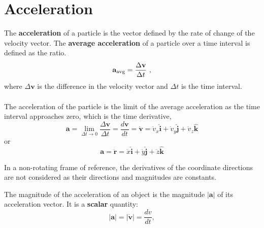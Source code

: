 \section{Acceleration}
The \textbf{acceleration} of a particle is the vector defined by the rate of change of the velocity vector. The \textbf{average acceleration} of a particle over a time interval is defined as the ratio.
\[
\mathbf{a}_{\rm{avg}} = \frac{\Delta\mathbf{v}}{\Delta t}\ ,
\]
where $\Delta\mathbf{v}$ is the difference in the velocity vector and $\Delta t$ is the time interval.
\\\\
The acceleration of the particle is the limit of the average acceleration as the time interval approaches zero, which is the time derivative,
\[
\mathbf{a} = \lim_{\Delta t\to 0}\frac{\Delta\mathbf{v}}{\Delta t} = \frac{d\mathbf{v} }{dt} = \dot{\mathbf{v}} = \dot{v}_x\hat{\mathbf{i}} + \dot{v}_y\hat{\mathbf{j}} + \dot {v}_z\hat{\mathbf{k}}
\]
or
\[
\mathbf{a} = \ddot{\mathbf{r}} = \ddot{x}\hat{\mathbf{i}} + \ddot{y}\hat{\mathbf{j}} + \ddot{z}\hat{\mathbf{k}}
\]
\begin{note}
In a non-rotating frame of reference, the derivatives of the coordinate directions are not considered as their directions and magnitudes are constants.
\end{note}
The magnitude of the acceleration of an object is the magnitude $|\mathbf{a}|$ of its acceleration vector. It is a \textbf{scalar} quantity:
\[
|\mathbf{a}| = |\dot{\mathbf{v}}| = \frac{dv}{dt},
\]

